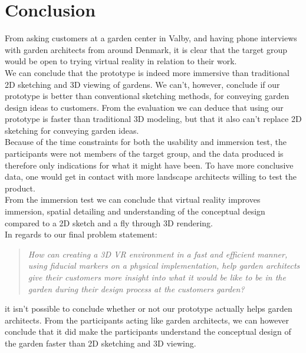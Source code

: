 \chapter{Conclusion}
From asking customers at a garden center in Valby, and having phone interviews with garden architects from around Denmark, it is clear that the target group would be open to trying virtual reality in relation to their work. \\

We can conclude that the prototype is indeed more immersive than traditional 2D sketching and 3D viewing of gardens. We can't, however, conclude if our prototype is better than conventional sketching methods, for conveying garden design ideas to customers. From the evaluation we can deduce that using our prototype is faster than traditional 3D modeling, but that it also can't replace 2D sketching for conveying garden ideas.\\

Because of the time constraints for both the usability and immersion test, the participants were not members of the target group, and the data produced is therefore only indications for what it might have been. To have more conclusive data, one would get in contact with more landscape architects willing to test the product.\\

From the immersion test we can conclude that virtual reality improves immersion, spatial detailing and understanding of the conceptual design compared to a 2D sketch and a fly through 3D rendering.\\

In regards to our final problem statement:\\
\begin{quote}
	\textit{How can creating a 3D VR environment in a fast and efficient manner, using fiducial markers on a physical implementation, help garden architects give their customers more insight into what it would be like to be in the garden during their design process at the customers garden?}\\
\end{quote}
it isn't possible to conclude whether or not our prototype actually helps garden architects. From the participants acting like garden architects, we can however conclude that it did make the participants understand the conceptual design of the garden faster than 2D sketching and 3D viewing.\\

